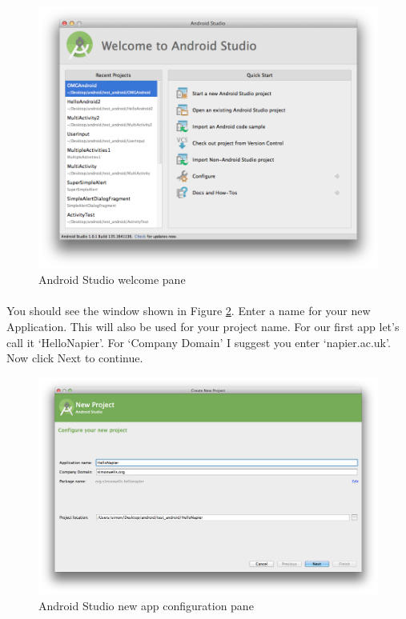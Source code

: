 \documentclass[12pt, a4paper, twoside]{book}
\begin{document}
\begin{figure}[H]
\centering
\includegraphics[width=\textwidth]{images/android-studio_01_welcome}
\caption{Android Studio welcome pane}
\label{fig:android.studio_welcome}
\end{figure}

\paragraph{} You should see the window shown in Figure \ref{fig:android.studio_config}. Enter a name for your new Application. This will also be used for your project name. For our first app let's call it `HelloNapier'. For `Company Domain' I suggest you enter `napier.ac.uk'. Now click Next to continue.

\begin{figure}[H]
\centering
\includegraphics[width=\textwidth]{images/android-studio_02_configure}
\caption{Android Studio new app configuration pane}
\label{fig:android.studio_config}
\end{figure}
\end{document}
